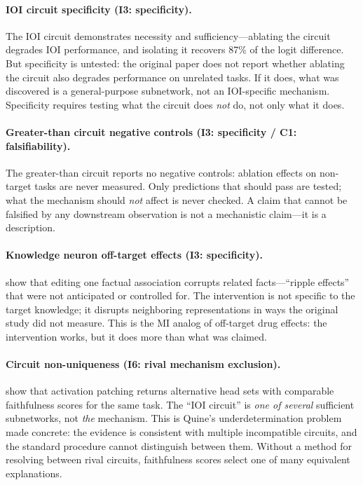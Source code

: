 \documentclass{article}
\begin{document}
\paragraph{IOI circuit specificity (I3: specificity).}
The IOI circuit \citep{wang2023interpretability} demonstrates necessity and sufficiency---ablating the circuit degrades IOI performance, and isolating it recovers 87\% of the logit difference. But specificity is untested: the original paper does not report whether ablating the circuit also degrades performance on unrelated tasks. If it does, what was discovered is a general-purpose subnetwork, not an IOI-specific mechanism. Specificity requires testing what the circuit does \emph{not} do, not only what it does.

\paragraph{Greater-than circuit negative controls (I3: specificity / C1: falsifiability).}
The greater-than circuit \citep{hanna2023greater} reports no negative controls: ablation effects on non-target tasks are never measured. Only predictions that should pass are tested; what the mechanism should \emph{not} affect is never checked. A claim that cannot be falsified by any downstream observation is not a mechanistic claim---it is a description.

\paragraph{Knowledge neuron off-target effects (I3: specificity).}
\citet{dai2022knowledge} show that editing one factual association corrupts related facts---``ripple effects'' that were not anticipated or controlled for. The intervention is not specific to the target knowledge; it disrupts neighboring representations in ways the original study did not measure. This is the MI analog of off-target drug effects: the intervention works, but it does more than what was claimed.

\paragraph{Circuit non-uniqueness (I6: rival mechanism exclusion).}
\citet{meloux2025everything} show that activation patching returns alternative head sets with comparable faithfulness scores for the same task. The ``IOI circuit'' is \emph{one of several} sufficient subnetworks, not \emph{the} mechanism. This is Quine's underdetermination problem \citep{quine1951two} made concrete: the evidence is consistent with multiple incompatible circuits, and the standard procedure cannot distinguish between them. Without a method for resolving between rival circuits, faithfulness scores select one of many equivalent explanations.
\end{document}
